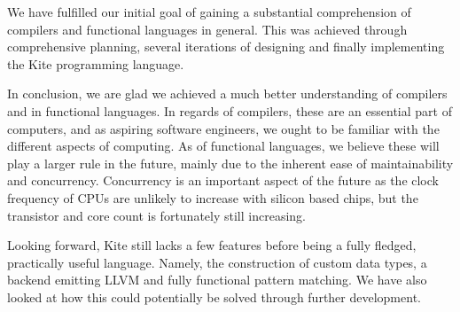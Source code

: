 
We have fulfilled our initial goal of gaining a substantial comprehension of compilers and functional languages in general. This was achieved through comprehensive planning, several iterations of designing and finally implementing the Kite programming language.

In conclusion, we are glad we achieved a much better understanding of compilers and in functional languages. In regards of compilers, these are an essential part of computers, and as aspiring software engineers, we ought to be familiar with the different aspects of computing. As of functional languages, we believe these will play a larger rule in the future, mainly due to the inherent ease of maintainability and concurrency. Concurrency is an important aspect of the future as the clock frequency of CPUs are unlikely to increase with silicon based chips, but the transistor and core count is fortunately still increasing.

Looking forward, Kite still lacks a few features before being a fully fledged, practically useful language. Namely, the construction of custom data types, a backend emitting LLVM and fully functional pattern matching. We have also looked at how this could potentially be solved through further development.
